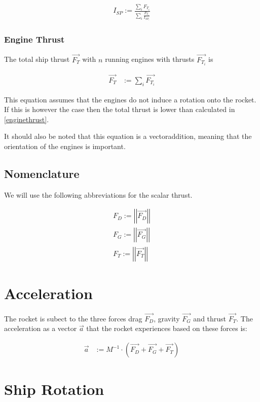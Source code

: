 \documentclass[11pt]{report}
\newcommand{\oa}[1]{\overrightarrow{#1}}
\newcommand{\isp}{I_{SP}}
\newcommand{\ispi}[1]{I_{SP_{#1}}}
\newcommand{\F}[1]{\oa{F_{#1}}}
\newcommand{\absvec}[1]{\left|\left|{#1}\right|\right|}
\begin{document}
\begin{align}
  \isp := \frac{\sum_i{F_{T_i}}}{\sum_i{\frac{F_{T_i}}{\ispi{i}}}}
\end{align}

\subsection{Engine Thrust}

The total  ship thrust $\F{T}$ with $n$ running engines
with thrusts $\F{T_i}$ is

\begin{align}
  \F{T} & := \sum_{i}\F{T_i}\label{enginethrust}
\end{align}

This equation assumes that the engines do not induce a rotation onto
the rocket. If this is however the case then the total thrust is lower
than calculated in \eqref{enginethrust}.

It should also be noted that this equation is a vectoraddition,
meaning that the orientation of the engines is important.

\section{Nomenclature}

We will use the following abbreviations for the scalar thrust.

\begin{align}
  F_D := \absvec{\oa{F_D}}\nonumber\\
  F_G := \absvec{\oa{F_G}}\nonumber\\
  F_T := \absvec{\oa{F_T}}\nonumber
\end{align}

\chapter{Acceleration}

The rocket is subect to the three forces drag $\F{D}$, gravity $\F{G}$
and thrust $\F{T}$.  The  acceleration as a vector
$\oa{a}$ that the rocket experiences based on these forces is:

\begin{align}
  \oa{a} &:= M^{-1} \cdot(\F{D} + \F{G} + \F{T})
\end{align}

\chapter{Ship Rotation}
\end{document}
